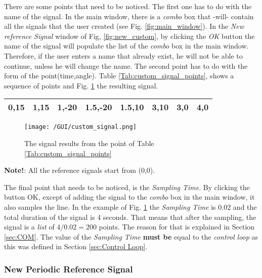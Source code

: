 There are some points that need to be noticed. The first one has to do with the name of the signal. In the main window, there is a \textit{combo} box that -will- contain all the signals that the user created (see Fig. \ref{fig:main_window}). In the \textit{New reference Signal} window of Fig, \ref{fig:new_custom}, by clicking the \textit{OK} button the name of the signal will populate the list of the \textit{combo} box in the main window. Therefore, if the user enters a name that already exist, he will not be able to continue, unless he will change the name. The second point has to do with the form of the point(time,angle). Table \ref{Tab:custom_signal_points}, shows a sequence of points and Fig. \ref{fig:custom_signal} the resulting signal.


\begin{center}
	 \label{Tab:custom_signal_points}
	\begin{tabular}{|c|c|c|c|c|c|c|c|}
		\hline 0,15 & 1,15 & 1,-20 & 1.5,-20 & 1.5,10 & 3,10 & 3,0 & 4,0 \\ \hline
	\end{tabular}
\end{center}


\begin{figure}[h!]
\centering
	\texttt{[image: /GUI/custom\_signal.png]}
	\caption{The signal results from the point of Table \ref{Tab:custom_signal_points}}
	\label{fig:custom_signal}
\end{figure}

\noindent \textbf{Note!}: All the reference signals start from (0,0).

The final point that needs to be noticed, is the \textit{Sampling Time}. By clicking the button OK, except of adding the signal to the \textit{combo} box in the main window, it also samples the line. In the example of Fig. \ref{fig:custom_signal} the \textit{Sampling Time} is 0.02 and the total duration of the signal is 4 seconds. That means that after the sampling, the signal is a \textit{list} of $4/0.02 = 200$ points. The reason for that is explained in Section \ref{sec:COM}. The value of the \textit{Sampling Time} \textbf{must be} equal to the \textit{control loop} as this was defined in Section \ref{sec:Control Loop}.

\subsubsection{New Periodic Reference Signal}

